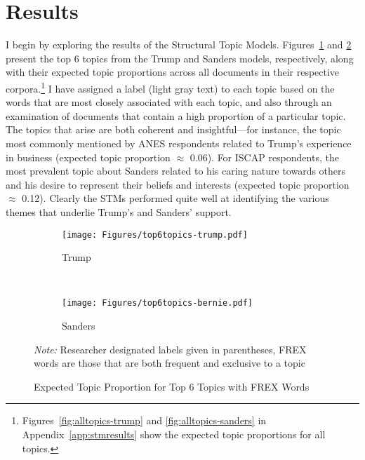 \documentclass[12pt]{article}
\begin{document}
\section{Results}\label{sec:results}
I begin by exploring the results of the Structural Topic Models. Figures~\ref{fig:top6topics-trump} and \ref{fig:top6topics-sanders} present the top 6 topics from the Trump and Sanders models, respectively, along with their expected topic proportions across all documents in their respective corpora.\footnote{Figures~\ref{fig:alltopics-trump} and \ref{fig:alltopics-sanders} in Appendix~\ref{app:stmresults} show the expected topic proportions for all topics.} I have assigned a label (light gray text) to each topic based on the words that are most closely associated with each topic, and also through an examination of documents that contain a high proportion of a particular topic. The topics that arise are both coherent and insightful---for instance, the topic most commonly mentioned by ANES respondents related to Trump's experience in business (expected topic proportion $\approx$ 0.06). For ISCAP respondents, the most prevalent topic about Sanders related to his caring nature towards others and his desire to represent their beliefs and interests (expected topic proportion $\approx$ 0.12). Clearly the STMs performed quite well at identifying the various themes that underlie Trump's and Sanders' support. 

\begin{figure}[t!]
\centering
   \begin{subfigure}[b]{0.75\textwidth}
	   \centering
	   \texttt{[image: Figures/top6topics-trump.pdf]}
	   \caption{Trump}
	   \label{fig:top6topics-trump} 
	\end{subfigure}
\\ 
	\begin{subfigure}[b]{0.75\textwidth}
		\centering
	   \texttt{[image: Figures/top6topics-bernie.pdf]}   
	   \caption{Sanders}
	   \label{fig:top6topics-sanders}
	\end{subfigure}
	\caption{Expected Topic Proportion for Top 6 Topics with FREX Words}\label{fig:top6topics}
	\vspace{-.25cm}
	{\scriptsize \textit{Note:} Researcher designated labels given in parentheses, FREX words are those that are both frequent and exclusive to a topic}
\end{figure}
\end{document}
